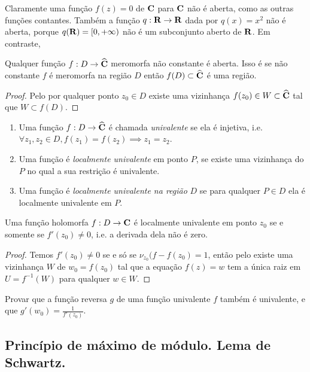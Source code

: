 Claramente uma função $f(z) = 0$ de $\mathbf{C}$ para $\mathbf{C}$ não é aberta, como as outras funções contantes.
Também a função $q: \mathbf{R} \to \mathbf{R}$ dada por $q(x) = x^2$ não é aberta,
porque $q(\mathbf{R}) = [0,+\infty)$ não é um subconjunto aberto de $\mathbf{R}$.
Em contraste,
\begin{teorema}
Qualquer função $f: D\to \widehat{\mathbf{C}}$ meromorfa não constante é aberta.
Isso é se não constante $f$ é meromorfa na região $D$ então $f(D) \subset \widehat{\mathbf{C}}$ é uma região.
\end{teorema}
\begin{proof}
Pelo  por qualquer ponto $z_0\in D$ existe uma vizinhança $f(z_0) \in W \subset \widehat{\mathbf{C}}$
tal que $W\subset f(D)$.
\end{proof}

\begin{defin}
\begin{enumerate}
\item Uma função $f: D\to\widehat{\mathbf{C}}$ é chamada \emph{univalente} se ela é injetiva, i.e.
$\forall z_1,z_2\in D, f(z_1) = f(z_2) \implies z_1 = z_2$.
\item Uma função é \emph{localmente univalente} em ponto $P$, se existe uma vizinhança
do $P$ no qual a sua restrição é univalente.
\item Uma função é \emph{localmente univalente na região} $D$ se para qualquer $P\in D$
ela é localmente univalente em $P$.
\end{enumerate}
\end{defin}

\begin{teorema}
\label{t:univalencia}
Uma função holomorfa $f : D\to \mathbf{C}$ é localmente univalente em ponto $z_0$ se e somente se 
$f'(z_0)\neq 0$, i.e. a derivada dela não é zero.
\end{teorema}
\begin{proof}
Temos $f'(z_0)\neq 0$ se e só se $\nu_{z_0}(f-f(z_0) = 1$,
então pelo  existe uma vizinhança $W$ de $w_0 = f(z_0)$
tal que a equação $f(z) = w$ tem a única raiz em $U = f^{-1}(W)$
para qualquer $w\in W$.
\end{proof}

\begin{problema}
Provar que a função reversa $g$ de uma função univalente $f$ também é univalente,
e que $g'(w_0) = \frac{1}{f'(z_0)}$.
\end{problema}

\subsection{Princípio de máximo de módulo. Lema de Schwartz.}

